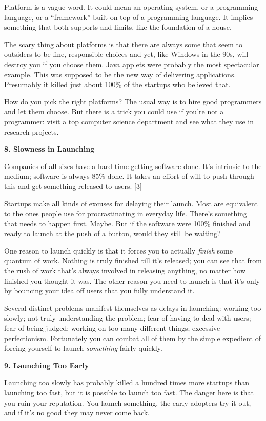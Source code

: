 Platform is a vague word. It could mean an operating system, or a
programming language, or a ``framework'' built on top of a programming
language. It implies something that both supports and limits, like the
foundation of a house.

The scary thing about platforms is that there are always some that seem
to outsiders to be fine, responsible choices and yet, like Windows in
the 90s, will destroy you if you choose them. Java applets were probably
the most spectacular example. This was supposed to be the new way of
delivering applications. Presumably it killed just about 100\% of the
startups who believed that.

How do you pick the right platforms? The usual way is to hire good
programmers and let them choose. But there is a trick you could use if
you're not a programmer: visit a top computer science department and see
what they use in research projects.

\textbf{8. Slowness in Launching}

Companies of all sizes have a hard time getting software done. It's
intrinsic to the medium; software is always 85\% done. It takes an
effort of will to push through this and get something released to users.
{[}\hyperref[f3n]{3}{]}

Startups make all kinds of excuses for delaying their launch. Most are
equivalent to the ones people use for procrastinating in everyday life.
There's something that needs to happen first. Maybe. But if the software
were 100\% finished and ready to launch at the push of a button, would
they still be waiting?

One reason to launch quickly is that it forces you to actually
\emph{finish} some quantum of work. Nothing is truly finished till it's
released; you can see that from the rush of work that's always involved
in releasing anything, no matter how finished you thought it was. The
other reason you need to launch is that it's only by bouncing your idea
off users that you fully understand it.

Several distinct problems manifest themselves as delays in launching:
working too slowly; not truly understanding the problem; fear of having
to deal with users; fear of being judged; working on too many different
things; excessive perfectionism. Fortunately you can combat all of them
by the simple expedient of forcing yourself to launch \emph{something}
fairly quickly.

\textbf{9. Launching Too Early}

Launching too slowly has probably killed a hundred times more startups
than launching too fast, but it is possible to launch too fast. The
danger here is that you ruin your reputation. You launch something, the
early adopters try it out, and if it's no good they may never come back.

